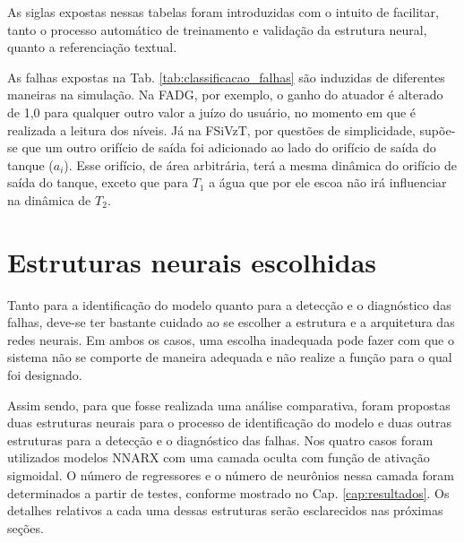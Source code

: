 
As siglas expostas nessas tabelas foram introduzidas com o intuito de facilitar,
tanto o processo automático de treinamento e validação da estrutura neural,
quanto a referenciação textual.

As falhas expostas na Tab. \ref{tab:classificacao_falhas} são induzidas de
diferentes maneiras na simulação. Na FADG, por exemplo, o ganho do atuador é
alterado de 1,0 para qualquer outro valor a juízo do usuário, no momento em que é
realizada a leitura dos níveis. Já na FSiVzT, por questões de simplicidade,
supõe-se que um outro orifício de saída foi adicionado ao lado do orifício de
saída do tanque ($a_i$). Esse orifício, de área arbitrária, terá a mesma
dinâmica do orifício de saída do tanque, exceto que para $T_1$ a água que por
ele escoa não irá influenciar na dinâmica de $T_2$.

\section{Estruturas neurais escolhidas}
Tanto para a identificação do modelo quanto para a detecção e o diagnóstico das
falhas, deve-se ter bastante cuidado ao se escolher a estrutura e a arquitetura
das redes neurais. Em ambos os casos, uma escolha inadequada pode fazer com que
o sistema não se comporte de maneira adequada e não realize a função para o qual
foi designado. 

Assim sendo, para que fosse realizada uma análise comparativa, foram propostas
duas estruturas neurais para o processo de identificação do modelo e duas outras
estruturas para a detecção e o diagnóstico das falhas. Nos quatro casos foram
utilizados modelos NNARX com uma camada oculta com função de ativação sigmoidal.
O número de regressores e o número de neurônios nessa camada foram determinados
a partir de testes, conforme mostrado no Cap. \ref{cap:resultados}. Os detalhes
relativos a cada uma dessas estruturas serão esclarecidos nas próximas seções.

